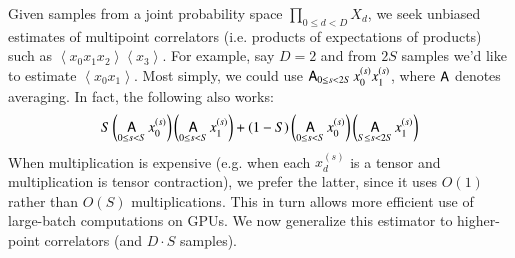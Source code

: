 \documentclass{article}
\newcommand{\wrap}[1]{\left(#1\right)}
\newcommand{\wang}[1]{\left\langle#1\right\rangle}
\DeclareMathOperator*{\Avg}{\text{\sffamily A}}
\begin{document}
    Given samples from a joint probability space $\prod_{0\leq d<D} X_d$, we
    seek unbiased estimates of multipoint correlators (i.e. products of
    expectations of products) such as $\wang{x_0 x_1 x_2}\wang{x_3}$.  For
    example, say $D=2$ and from $2S$ samples we'd like to estimate $\wang{x_0
    x_1}$.  Most simply, we could use $\Avg_{0\leq s<2S} x_0^{(s)} x_1^{(s)}$,
    where $\Avg$ denotes averaging.  In fact, the following also works:
    \begin{equation} \label{eq:bessel}
        S
        \wrap{\Avg_{0\leq s< S} x_0^{(s)}}
        \wrap{\Avg_{0\leq s< S} x_1^{(s)}}
        +
        (1-S)
        \wrap{\Avg_{0\leq s< S} x_0^{(s)}}
        \wrap{\Avg_{S\leq s<2S} x_1^{(s)}}
    \end{equation}
    When multiplication is expensive (e.g. when each $x_d^{(s)}$ is a tensor
    and multiplication is tensor contraction), we prefer the latter, since it
    uses $O(1)$ rather than $O(S)$ multiplications.  This in turn allows more
    efficient use of large-batch computations on GPUs.  We now generalize this
    estimator to higher-point correlators (and $D\cdot S$ samples).
\end{document}
